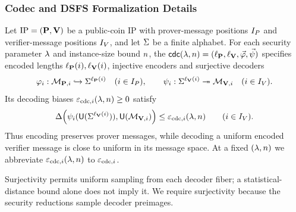 
\subsubsection{Codec and DSFS Formalization Details}
\label{sec:dsfs_codec_dsfs_formal_interface}

\begin{definition}
\label{def:dsfs_codec}
Let \(\mathrm{IP}=(\mathbf{P},\mathbf{V})\) be a public-coin IP with prover-message positions \(I_P\) and verifier-message positions \(I_V\), and let \(\Sigma\) be a finite alphabet. For each security parameter \(\lambda\) and instance-size bound \(n\), the  \(\mathsf{cdc}(\lambda,n)=(\ell_{\mathbf{P}},\ell_{\mathbf{V}},\vec{\varphi},\vec{\psi})\) specifies encoded lengths \(\ell_{\mathbf{P}}(i),\ell_{\mathbf{V}}(i)\), injective encoders and surjective decoders
\begin{equation*}
  \varphi_i:\mathcal M_{\mathbf{P},i}\hookrightarrow\Sigma^{\ell_{\mathbf{P}}(i)}
    \quad(i\in I_P),\qquad
  \psi_i:\Sigma^{\ell_{\mathbf{V}}(i)}\twoheadrightarrow\mathcal M_{\mathbf{V},i}
    \quad(i\in I_V).
\end{equation*}
Its decoding biases \(\varepsilon_{\mathrm{cdc},i}(\lambda,n)\ge0\) satisfy
\begin{equation*}
  \Delta\!\left(\psi_i(\mathsf{U}(\Sigma^{\ell_{\mathbf{V}}(i)})),
                  \mathsf{U}(\mathcal M_{\mathbf{V},i})\right)
       \le\varepsilon_{\mathrm{cdc},i}(\lambda,n)\qquad(i\in I_V).
\end{equation*}
Thus encoding preserves prover messages, while decoding a uniform encoded verifier message is close to uniform in its message space. At a fixed \((\lambda,n)\) we abbreviate \(\varepsilon_{\mathrm{cdc},i}(\lambda,n)\) to \(\varepsilon_{\mathrm{cdc},i}\).
\leanok
{}
\end{definition}

\begin{remark}
\label{rem:dsfs_codec_comparison}
Surjectivity permits uniform sampling from each decoder fiber; a statistical-distance bound alone does not imply it. We require surjectivity because the security reductions sample decoder preimages.
\end{remark}

